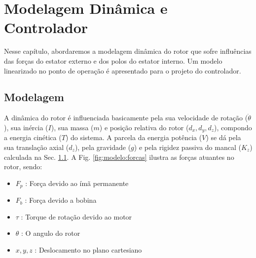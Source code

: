 \pagestyle{empty}
\cleardoublepage
\pagestyle{fancy}

\chapter{Modelagem Dinâmica e Controlador} \label{Cap:Modelagem:Dinamica}

 Nesse capítulo, abordaremos a modelagem dinâmica do rotor que sofre influências das forças do estator externo e dos polos do estator interno. Um modelo linearizado no ponto de operação é apresentado para o projeto do controlador.
 
\section{Modelagem}

A dinâmica do rotor é influenciada basicamente pela sua velocidade de rotação ($\dot{\theta}$), sua inércia ($I$), sua massa ($m$) e posição relativa do rotor ($d_x,d_y,d_z$), compondo a energia cinética ($T$) do sistema. A parcela da energia potência ($V$) se dá pela sua translação axial ($d_z$), pela gravidade ($g$) e pela rigidez passiva do mancal ($K_z$) calculada na  Sec. \ref{}. A Fig. \ref{fig:modelo:forcas} ilustra as forças atuantes no rotor, sendo:

 \begin{itemize}
 	\item $F_p$ : Força devido ao ímã permanente
 	\item $F_b$ : Força devido a bobina
 	\item $\tau$ : Torque de rotação devido ao motor
 	\item $\theta$ : O angulo do rotor
 	\item $x,y,z$ : Deslocamento no plano cartesiano 
 \end{itemize}

